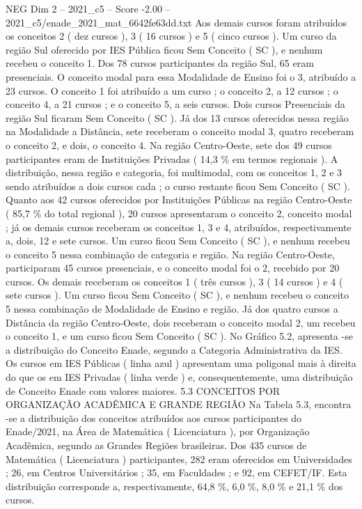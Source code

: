 \begin{textsample}{NEG Dim 2 – 2021\_c5 – Score -2.00 – 2021\_c5/enade\_2021\_mat\_6642fe63dd.txt}
Aos demais cursos foram atribuídos os conceitos 2 ( dez cursos ), 3 ( 16 cursos ) e 5 ( cinco cursos ).
Um curso da região Sul oferecido por IES Pública ficou Sem Conceito ( SC ), e nenhum recebeu o conceito 1.
Dos 78 cursos participantes da região Sul, 65 eram presenciais.
O conceito modal para essa Modalidade de Ensino foi o 3, atribuído a 23 cursos.
O conceito 1 foi atribuído a um curso ; o conceito 2, a 12 cursos ; o conceito 4, a 21 cursos ; e o conceito 5, a seis cursos.
Dois cursos Presenciais da região Sul ficaram Sem Conceito ( SC ).
Já dos 13 cursos oferecidos nessa região na Modalidade a Distância, sete receberam o conceito modal 3, quatro receberam o conceito 2, e dois, o conceito 4.
Na região Centro-Oeste, sete dos 49 cursos participantes eram de Instituições Privadas ( 14,3 \% em termos regionais ).
A distribuição, nessa região e categoria, foi multimodal, com os conceitos 1, 2 e 3 sendo atribuídos a dois cursos cada ; o curso restante ficou Sem Conceito ( SC ).
Quanto aos 42 cursos oferecidos por Instituições Públicas na região Centro-Oeste ( 85,7 \% do total regional ), 20 cursos apresentaram o conceito 2, conceito modal ; já os demais cursos receberam os conceitos 1, 3 e 4, atribuídos, respectivamente a, dois, 12 e sete cursos.
Um curso ficou Sem Conceito ( SC ), e nenhum recebeu o conceito 5 nessa combinação de categoria e região.
Na região Centro-Oeste, participaram 45 cursos presenciais, e o conceito modal foi o 2, recebido por 20 cursos.
Os demais receberam os conceitos 1 ( três cursos ), 3 ( 14 cursos ) e 4 ( sete cursos ).
Um curso ficou Sem Conceito ( SC ), e nenhum recebeu o conceito 5 nessa combinação de Modalidade de Ensino e região.
Já dos quatro cursos a Distância da região Centro-Oeste, dois receberam o conceito modal 2, um recebeu o conceito 1, e um curso ficou Sem Conceito ( SC ).
No Gráfico 5.2, apresenta -se a distribuição do Conceito Enade, segundo a Categoria Administrativa da IES.
Os cursos em IES Públicas ( linha azul ) apresentam uma poligonal mais à direita do que os em IES Privadas ( linha verde ) e, consequentemente, uma distribuição de Conceito Enade com valores maiores. 5.3 CONCEITOS POR ORGANIZAÇÃO ACADÊMICA E GRANDE REGIÃO Na Tabela 5.3, encontra -se a distribuição dos conceitos atribuídos aos cursos participantes do Enade/2021, na Área de Matemática ( Licenciatura ), por Organização Acadêmica, segundo as Grandes Regiões brasileiras.
Dos 435 cursos de Matemática ( Licenciatura ) participantes, 282 eram oferecidos em Universidades ; 26, em Centros Universitários ; 35, em Faculdades ; e 92, em CEFET/IF.
Esta distribuição corresponde a, respectivamente, 64,8 \%, 6,0 \%, 8,0 \% e 21,1 \% dos cursos.

\end{textsample}
